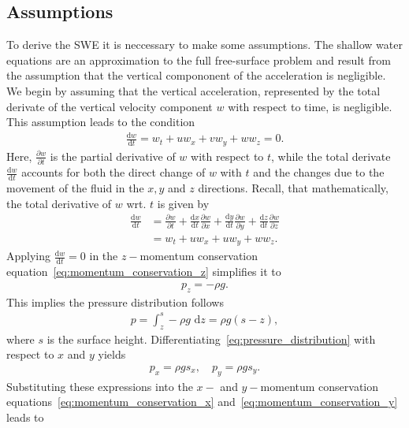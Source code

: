 \subsection{Assumptions}
To derive the SWE it is neccessary to make some assumptions. 
The shallow water equations are an approximation to the full free-surface problem and result from the assumption that the vertical compononent of the acceleration is negligible.
We begin by assuming that the vertical acceleration, represented by the total derivate of the vertical velocity component $w$ with respect to time, is negligible.
This assumption leads to the condition
\begin{align*}%
    \frac{\text{d} w}{\text{d} t} = w_t + uw_x + vw_y + ww_z = 0.
\end{align*}
Here, $\frac{\partial w}{\partial t}$ is the partial derivative of $w$ with respect to $t$, while the total derivate $\frac{\text{d} w}{\text{d} t}$ accounts for both the direct change of $w$ with $t$ and the changes due to the movement of the fluid in the $x, y$ and $z$ directions.
Recall, that mathematically, the total derivative of $w$ wrt. $t$ is given by
\begin{align*}
    \frac{\text{d} w}{\text{d} t} &= \frac{\partial w}{\partial t} + \frac{\text{d} x}{\text{d} t} \frac{\partial w}{\partial x} + \frac{\text{d} y}{\text{d} t}  \frac{\partial w}{\partial y} + \frac{\text{d} z}{\text{d} t}  \frac{\partial w}{\partial z} \\
    &= w_t + u w_x + u w_y + w w_z .
\end{align*}
Applying $\frac{\text{d}w}{\text{d}t} = 0$ in the $z-$momentum conservation equation~\eqref{eq:momentum_conservation_z} simplifies it to
\begin{align*}
    p_z = -\rho g.
\end{align*}
This implies the pressure distribution follows
\begin{align}\label{eq:pressure_distribution}
    p = \int_z^s - \rho g \text{ d} z = \rho g (s - z),
\end{align}
where $s$ is the surface height.
Differentiating~\eqref{eq:pressure_distribution} with respect to $x$ and $y$ yields
\begin{align*}%
    p_x = \rho g s_x, \quad p_y = \rho g s_y.
\end{align*}
Substituting these expressions into the $x-$ and $y-$momentum conservation equations~\eqref{eq:momentum_conservation_x} and~\eqref{eq:momentum_conservation_y} leads to 
